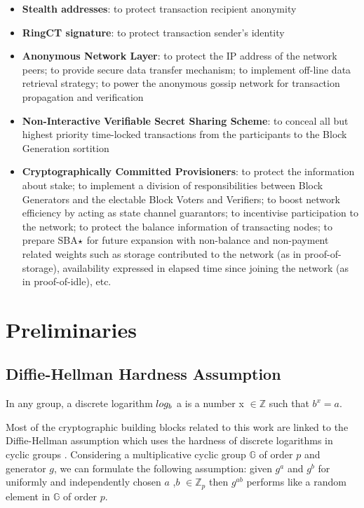 \begin{itemize}
\item \textbf{Stealth addresses}: to protect transaction recipient anonymity
\item \textbf{RingCT signature}: to protect transaction sender's identity
\item \textbf{Anonymous Network Layer}: to protect the IP address of the network peers; to provide secure data transfer mechanism; to implement off-line data retrieval strategy; to power the anonymous gossip network for transaction propagation and verification
\item \textbf{Non-Interactive Verifiable Secret Sharing Scheme}: to conceal all but highest priority time-locked transactions from the participants to the Block Generation sortition
\item \textbf{Cryptographically Committed Provisioners}: to protect the information about stake; to implement a division of responsibilities between Block Generators and the electable Block Voters and Verifiers; to boost network efficiency by acting as state channel guarantors; to incentivise participation to the network; to protect the balance information of transacting nodes; to prepare SBA$\large\star$ for future expansion with non-balance and non-payment related weights such as storage contributed to the network (as in proof-of-storage), availability expressed in elapsed time since joining the network (as in proof-of-idle), etc.
\end{itemize}

\section {Preliminaries}

\subsection{Diffie-Hellman Hardness Assumption}

In any group, a discrete logarithm $log_b\space$ a is a number x $\in \mathbb{Z}$ such that $b^x = a$. 

Most of the cryptographic building blocks related to this work are linked to the Diffie-Hellman assumption which uses the hardness of discrete logarithms in cyclic groups \cite{CyclicGroup}. Considering a multiplicative cyclic group $\mathbb{G}$ of order $p$ and generator \cite{Generator} $g$, we can formulate the following assumption: given $g^a$ and $g^b$ for uniformly and independently chosen $a$ ,$b$ $\in \mathbb{Z}_p$ then $g^{ab}$ performs like a random element in $\mathbb{G}$ of order $p$.

